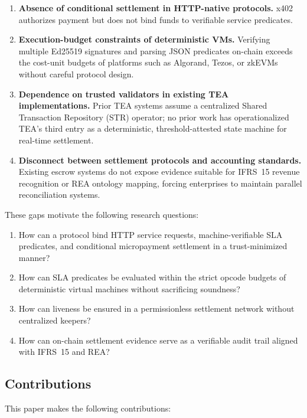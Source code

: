 \documentclass[journal]{IEEEtran}
\begin{document}
\begin{enumerate}[label=\textbf{G\arabic*.},leftmargin=*]
    \item \textbf{Absence of conditional settlement in HTTP-native protocols.} x402 authorizes payment but does not bind funds to verifiable service predicates.
    \item \textbf{Execution-budget constraints of deterministic VMs.} Verifying multiple Ed25519 signatures and parsing JSON predicates on-chain exceeds the cost-unit budgets of platforms such as Algorand, Tezos, or zkEVMs without careful protocol design.
    \item \textbf{Dependence on trusted validators in existing TEA implementations.} Prior TEA systems assume a centralized Shared Transaction Repository (STR) operator; no prior work has operationalized TEA's third entry as a deterministic, threshold-attested state machine for real-time settlement.
    \item \textbf{Disconnect between settlement protocols and accounting standards.} Existing escrow systems do not expose evidence suitable for IFRS~15 revenue recognition or REA ontology mapping, forcing enterprises to maintain parallel reconciliation systems.
\end{enumerate}

\noindent These gaps motivate the following research questions:

\begin{enumerate}[label=\textbf{RQ\arabic*.},leftmargin=*]
    \item How can a protocol bind HTTP service requests, machine-verifiable SLA predicates, and conditional micropayment settlement in a trust-minimized manner?
    \item How can SLA predicates be evaluated within the strict opcode budgets of deterministic virtual machines without sacrificing soundness?
    \item How can liveness be ensured in a permissionless settlement network without centralized keepers?
    \item How can on-chain settlement evidence serve as a verifiable audit trail aligned with IFRS~15 and REA?
\end{enumerate}

\subsection{Contributions}
This paper makes the following contributions:
\end{document}
